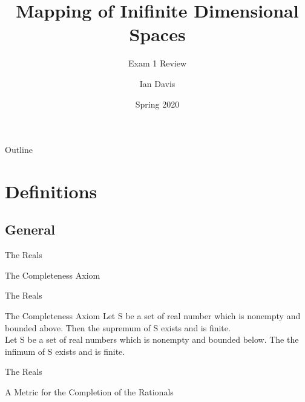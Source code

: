 \documentclass{beamer}
\title[Math 8210: Review 1] %
{Mapping of Inifinite Dimensional Spaces}
\subtitle
{Exam 1 Review}
\author[Davis, 2020] %
{Ian Davis\inst{1}}
\institute[Clemson University] %
{
  \inst{1}%
  John E. Walker Department of Economics\\
  Clemson University
  }
\date[Spring 2020] %
{Spring 2020}
\begin{document}
\begin{frame}
  \titlepage
\end{frame}

\begin{frame}{Outline}
  \tableofcontents
\end{frame}





\section{Definitions}
\subsection{General}

\begin{frame}{The Reals}

	\begin{block}{The Completeness Axiom}
	\end{block}

\end{frame}
\begin{frame}{The Reals}
	\begin{block}{The Completeness Axiom}
		Let S be a set of real number which is nonempty and bounded above. Then the supremum of S exists and is finite.\\
		Let S be a set of real numbers which is nonempty and bounded below. The the infimum of S exists and is finite.
	\end{block}
\end{frame}

\begin{frame}{The Reals}

        \begin{block}{A Metric for the Completion of the Rationals}
        \end{block}

\end{frame}
\end{document}
